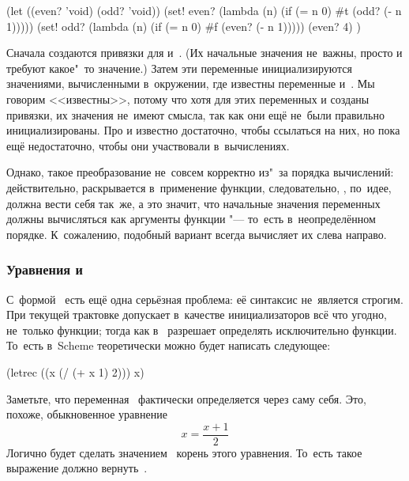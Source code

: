 \begin{code:lisp}
(let ((even? 'void) (odd? 'void))
  (set! even? (lambda (n) (if (= n 0) #t (odd? (- n 1)))))
  (set! odd? (lambda (n) (if (= n 0) #f (even? (- n 1)))))
  (even? 4) )
\end{code:lisp}

Сначала создаются привязки для  и~. (Их начальные значения
не~важны, просто  и  требуют какое"~то значение.) Затем эти
переменные инициализируются значениями, вычисленными в~окружении, где известны
переменные  и~. Мы говорим <<известны>>, потому что хотя для
этих переменных и созданы привязки, их значения не~имеют смысла, так как они
ещё не~были правильно инициализированы. Про  и  известно
достаточно, чтобы ссылаться на них, но пока ещё недостаточно, чтобы они
участвовали в~вычислениях.

Однако, такое преобразование не~совсем корректно из"~за порядка вычислений:
действительно,  раскрывается в~применение функции, следовательно,
, по~идее, должна вести себя так~же, а это значит, что начальные
значения переменных должны вычисляться как аргументы функции "--- то~есть
в~неопределённом порядке. К~сожалению, подобный вариант всегда вычисляет их
слева направо. 


\subsubsection{\texorpdfstring{Уравнения и~\protect{}}%
{Уравнения и letrec}}

С~формой~ есть ещё одна серьёзная проблема: её синтаксис не~является
строгим. При текущей трактовке  допускает в~качестве инициализаторов
всё что угодно, не~только функции; тогда как  в~{\CommonLisp}
разрешает определять исключительно функции. То~есть в~Scheme теоретически можно
будет написать следующее:

\begin{code:lisp}
(letrec ((x (/ (+ x 1) 2))) x)
\end{code:lisp}

Заметьте, что переменная~ фактически определяется через саму себя. Это,
похоже, обыкновенное уравнение
%
\[  x = \frac{x + 1}{2}  \]
%
Логично будет сделать значением~ корень этого уравнения. То~есть такое
выражение должно вернуть~.

